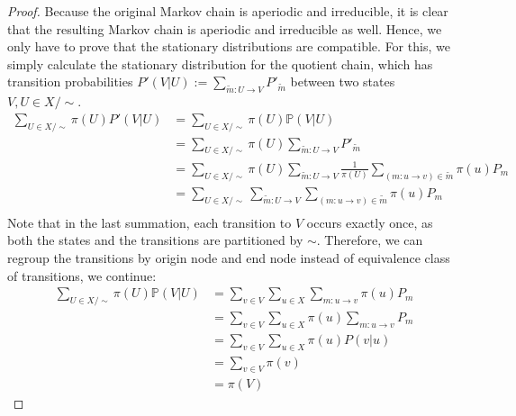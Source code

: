 \documentclass[10pt,a4paper]{amsart}
\newcommand{\PP}{\mathbb{P}}
\begin{document}
\begin{proof}
    Because the original Markov chain is aperiodic and irreducible, it is clear that the resulting Markov chain is aperiodic and irreducible as well. Hence, we only have to prove that the stationary distributions are compatible. For this, we simply calculate the stationary distribution for the quotient chain, which has transition probabilities $P'(V|U) := \sum_{\widetilde{m}: U \to V} P'_{\widetilde{m}}$ between two states $V,U\in X/\sim$.
    \begin{align*}
        \sum_{U\in X/\sim} \pi(U) P'(V|U) 
            &= \sum_{U\in X/\sim} \pi(U) \PP(V|U) \\
            &= \sum_{U\in X/\sim} \pi(U) \sum_{\widetilde{m}: U\to V} P'_{\widetilde{m}} \\
            &= \sum_{U\in X/\sim} \pi(U) \sum_{\widetilde{m}: U\to V} \frac{1}{\pi(U)} \sum_{(m:u\to v)\in\widetilde{m}}\pi(u) P_m \\
            &= \sum_{U\in X/\sim} \sum_{\widetilde{m}: U\to V} \sum_{(m:u\to v)\in\widetilde{m}}\pi(u) P_m \\     
    \end{align*}
    Note that in the last summation, each transition to $V$ occurs exactly once, as both the states and the transitions are partitioned by $\sim$. Therefore, we can regroup the transitions by origin node and end node instead of equivalence class of transitions, we continue:
    \begin{align*}
        \sum_{U\in X/\sim} \pi(U) \PP(V|U) 
            &= \sum_{v\in V} \sum_{u \in X} \sum_{m:u\to v}\pi(u) P_m \\
            &= \sum_{v\in V} \sum_{u \in X} \pi(u) \sum_{m:u\to v} P_m \\
            &= \sum_{v\in V} \sum_{u \in X} \pi(u) P(v | u) \\
            &= \sum_{v\in V} \pi (v) \\
            &= \pi(V)
    \end{align*}

\end{proof}
\end{document}
